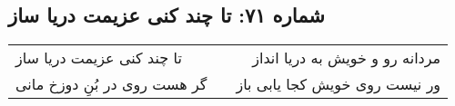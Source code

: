\begin{center}
\section*{شماره ۷۱: تا چند کنی عزیمت دریا ساز}
\label{sec:071}
\begin{longtable}{l p{0.5cm} r}
تا چند کنی عزیمت دریا ساز
&&
مردانه رو و خویش به دریا انداز
\\
گر هست روی در بُنِ دوزخ مانی
&&
ور نیست روی خویش کجا یابی باز
\\
\end{longtable}
\end{center}
